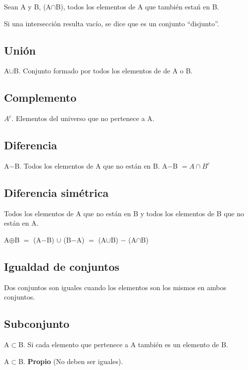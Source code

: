 \documentclass{article}
\begin{document}
Sean A y B, (A$\cap$B), todos los elementos de A que también estań en B.
\vspace{1em}

Si una intersección resulta vacío, se dice que es un conjunto ``disjunto''.

\subsection{Unión}

A$\cup$B. Conjunto formado por todos los elementos de de A o B.

\subsection{Complemento}

$A^c$. Elementos del universo que no pertenece a A.

\subsection{Diferencia}

A$-$B. Todos los elementos de A que no están en B.
A$-$B $= A\cap B^c$

\subsection{Diferencia simétrica}
Todos los elementos de A que no están en B y todos los elementos de B que no
están en A.
\vspace{1em}

A$\oplus$B $=$ (A$-$B) $\cup$ (B$-$A) $=$ (A$\cup$B) $-$ (A$\cap$B)

\subsection{Igualdad de conjuntos}

Dos conjuntos son iguales cuando los elementos son los mismos en ambos conjuntos.

\subsection{Subconjunto}

A$\subset$B. Si cada elemento que pertenece a A también es un elemento de B.
\vspace{1em}

A$\subset$B. \textbf{Propio} (No deben ser iguales).
\end{document}
